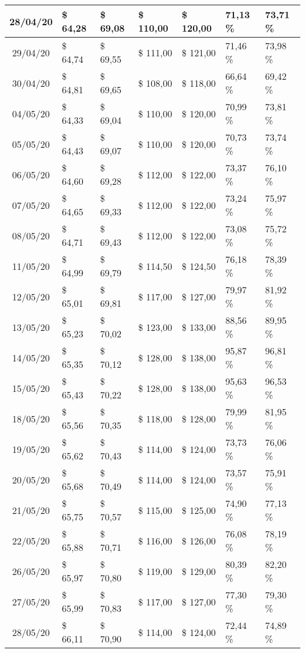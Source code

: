 \begin{center}
\begin{longtable}{|c|p{1.5cm}|p{1.5cm}|p{1.5cm}|p{1.5cm}|p{1.5cm}|p{1.5cm}|}
28/04/20 & \$ 64,28 & \$ 69,08 & \$ 110,00 & \$ 120,00 & 71,13 \% & 73,71 \% \\ \hline
29/04/20 & \$ 64,74 & \$ 69,55 & \$ 111,00 & \$ 121,00 & 71,46 \% & 73,98 \% \\ \hline
30/04/20 & \$ 64,81 & \$ 69,65 & \$ 108,00 & \$ 118,00 & 66,64 \% & 69,42 \% \\ \hline
04/05/20 & \$ 64,33 & \$ 69,04 & \$ 110,00 & \$ 120,00 & 70,99 \% & 73,81 \% \\ \hline
05/05/20 & \$ 64,43 & \$ 69,07 & \$ 110,00 & \$ 120,00 & 70,73 \% & 73,74 \% \\ \hline
06/05/20 & \$ 64,60 & \$ 69,28 & \$ 112,00 & \$ 122,00 & 73,37 \% & 76,10 \% \\ \hline
07/05/20 & \$ 64,65 & \$ 69,33 & \$ 112,00 & \$ 122,00 & 73,24 \% & 75,97 \% \\ \hline
08/05/20 & \$ 64,71 & \$ 69,43 & \$ 112,00 & \$ 122,00 & 73,08 \% & 75,72 \% \\ \hline
11/05/20 & \$ 64,99 & \$ 69,79 & \$ 114,50 & \$ 124,50 & 76,18 \% & 78,39 \% \\ \hline
12/05/20 & \$ 65,01 & \$ 69,81 & \$ 117,00 & \$ 127,00 & 79,97 \% & 81,92 \% \\ \hline
13/05/20 & \$ 65,23 & \$ 70,02 & \$ 123,00 & \$ 133,00 & 88,56 \% & 89,95 \% \\ \hline
14/05/20 & \$ 65,35 & \$ 70,12 & \$ 128,00 & \$ 138,00 & 95,87 \% & 96,81 \% \\ \hline
15/05/20 & \$ 65,43 & \$ 70,22 & \$ 128,00 & \$ 138,00 & 95,63 \% & 96,53 \% \\ \hline
18/05/20 & \$ 65,56 & \$ 70,35 & \$ 118,00 & \$ 128,00 & 79,99 \% & 81,95 \% \\ \hline
19/05/20 & \$ 65,62 & \$ 70,43 & \$ 114,00 & \$ 124,00 & 73,73 \% & 76,06 \% \\ \hline
20/05/20 & \$ 65,68 & \$ 70,49 & \$ 114,00 & \$ 124,00 & 73,57 \% & 75,91 \% \\ \hline
21/05/20 & \$ 65,75 & \$ 70,57 & \$ 115,00 & \$ 125,00 & 74,90 \% & 77,13 \% \\ \hline
22/05/20 & \$ 65,88 & \$ 70,71 & \$ 116,00 & \$ 126,00 & 76,08 \% & 78,19 \% \\ \hline
26/05/20 & \$ 65,97 & \$ 70,80 & \$ 119,00 & \$ 129,00 & 80,39 \% & 82,20 \% \\ \hline
27/05/20 & \$ 65,99 & \$ 70,83 & \$ 117,00 & \$ 127,00 & 77,30 \% & 79,30 \% \\ \hline
28/05/20 & \$ 66,11 & \$ 70,90 & \$ 114,00 & \$ 124,00 & 72,44 \% & 74,89 \% \\ \hline

\end{longtable}
\end{center}
